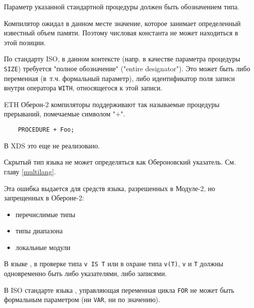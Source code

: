 Параметр указанной стандартной процедуры должен быть обозначением типа.


Компилятор ожидал в данном месте значение, которое занимает определенный
известный объем памяти. Поэтому числовая константа не может находиться
в этой позиции.


По стандарту ISO, в данном контексте (напр. в качестве параметра процедуры 
\verb'SIZE') требуется "полное обозначение" ("entire designator"). 
Это может быть либо переменная (в~т.ч. формальный параметр), либо
идентификатор поля записи внутри оператора \verb'WITH', относящегося к 
этой записи.


ETH Оберон-2 компиляторы  поддерживают так называемые процедуры
прерываний, помечаемые символом "+".

\verb'    PROCEDURE + Foo;'

В XDS это еще не реализовано.


Скрытый тип языка \mt{} не может определяться как Обероновский указатель.
См. главу \ref{multilang}.


Эта ошибка выдается для средств языка, разрешенных в Модуле-2, но
запрещенных в Обероне-2:
\begin{itemize}
\item перечислимые типы
\item типы диапазона
\item локальные модули
\end{itemize}


В языке \ot{}, в проверке типа \verb'v IS T' или в охране типа \verb'v(T)',
\verb'v' и \verb'T' должны одновременно быть либо указателями, либо записями.


В ISO стандарте языка \mt{}, управляющая переменная цикла \verb'FOR'
не может быть формальным параметром (ни \verb'VAR', ни по значению).


